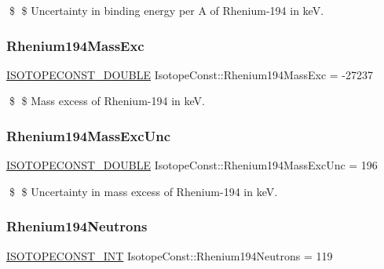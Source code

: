 \$ \$ Uncertainty in binding energy per A of Rhenium-\/194 in keV. \mbox{\label{group___isotope_const-_rhenium-_re194_gaf83cfa8598df08c72d92512c2424aaa6}} 
\subsubsection{\texorpdfstring{Rhenium194\+Mass\+Exc}{Rhenium194MassExc}}
{\footnotesize\ttfamily \mbox{\hyperlink{group___isotope_const-_macros_ga8f45a7272ce02c0b4c65c44636ed719a}{I\+S\+O\+T\+O\+P\+E\+C\+O\+N\+S\+T\+\_\+\+D\+O\+U\+B\+LE}} Isotope\+Const\+::\+Rhenium194\+Mass\+Exc = -\/27237}

\$ \$ Mass excess of Rhenium-\/194 in keV. \mbox{\label{group___isotope_const-_rhenium-_re194_gacd88260165d774ded3379c4573541b2c}} 
\subsubsection{\texorpdfstring{Rhenium194\+Mass\+Exc\+Unc}{Rhenium194MassExcUnc}}
{\footnotesize\ttfamily \mbox{\hyperlink{group___isotope_const-_macros_ga8f45a7272ce02c0b4c65c44636ed719a}{I\+S\+O\+T\+O\+P\+E\+C\+O\+N\+S\+T\+\_\+\+D\+O\+U\+B\+LE}} Isotope\+Const\+::\+Rhenium194\+Mass\+Exc\+Unc = 196}

\$ \$ Uncertainty in mass excess of Rhenium-\/194 in keV. \mbox{\label{group___isotope_const-_rhenium-_re194_ga978553b8cf92c211c38561ee87b619bf}} 
\subsubsection{\texorpdfstring{Rhenium194\+Neutrons}{Rhenium194Neutrons}}
{\footnotesize\ttfamily \mbox{\hyperlink{group___isotope_const-_macros_ga5f18360b3e99483a35c32d789e62621c}{I\+S\+O\+T\+O\+P\+E\+C\+O\+N\+S\+T\+\_\+\+I\+NT}} Isotope\+Const\+::\+Rhenium194\+Neutrons = 119}

